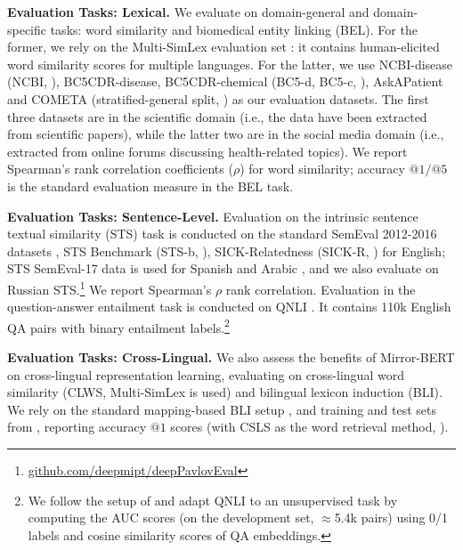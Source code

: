 \documentclass[11pt]{article}
\begin{document}
\noindent \textbf{Evaluation Tasks: Lexical.}
We evaluate on domain-general and domain-specific tasks: word similarity and biomedical entity linking (BEL). For the former, we rely on the Multi-SimLex evaluation set \citep{vulic2020multi}: it contains human-elicited word similarity scores for multiple languages. For the latter, we use NCBI-disease (NCBI, \citealt{dougan2014ncbi}), BC5CDR-disease, BC5CDR-chemical (BC5-d, BC5-c, \citealt{li2016biocreative}), AskAPatient \citep{limsopatham2016normalising} and COMETA (stratified-general split, \citealt{cometa}) as our evaluation datasets. The first three datasets are in the scientific domain (i.e., the data have been extracted from scientific papers), while the latter two are in the social media domain (i.e., extracted from online forums discussing health-related topics). We report Spearman's rank correlation coefficients ($\rho$) for word similarity; accuracy $@1/@5$ is the standard evaluation measure in the BEL task.

\vspace{1.5mm}
\noindent \textbf{Evaluation Tasks: Sentence-Level.}
Evaluation on the intrinsic sentence textual similarity (STS) task is conducted on the standard SemEval 2012-2016 datasets \citep{agirre2012semeval,agirre2013sem,agirre2014semeval,agirre2015semeval,agirre2016semeval}, STS Benchmark (STS-b, \citealt{cer2017semeval}), SICK-Relatedness (SICK-R, \citealt{marelli2014sick}) for English; STS SemEval-17 data is used for Spanish and Arabic \cite{cer2017semeval}, and we also evaluate on Russian STS.\footnote{\url{github.com/deepmipt/deepPavlovEval}} We report Spearman's $\rho$ rank correlation. Evaluation in the question-answer entailment task is conducted on QNLI \citep{rajpurkar2016squad,wang2018glue}. It contains 110k English QA pairs with binary entailment labels.\footnote{We follow the setup of \citet{li-etal-2020-sentence} and adapt QNLI to an unsupervised task by computing the AUC scores (on the development set, $\approx$5.4k pairs) using 0/1 labels and cosine similarity scores of QA embeddings.}







\vspace{1.5mm}
\noindent \textbf{Evaluation Tasks: Cross-Lingual.} We also assess the benefits of Mirror-BERT on cross-lingual representation learning, evaluating on cross-lingual word similarity (CLWS, Multi-SimLex is used) and bilingual lexicon induction (BLI). We rely on the standard mapping-based BLI setup \cite{artetxe-etal-2018-robust}, and training and test sets from \citet{glavas-etal-2019-properly}, reporting accuracy $@1$ scores (with CSLS as the word retrieval method, \citealt{lample2018word}).
\end{document}
